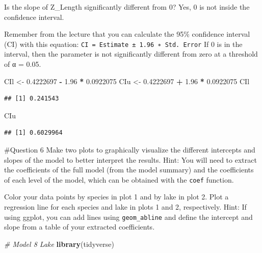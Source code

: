 \documentclass[
]{article}
\newenvironment{Shaded}{\begin{snugshade}}{\end{snugshade}}
\newcommand{\CommentTok}[1]{\textcolor[rgb]{0.56,0.35,0.01}{\textit{#1}}}
\newcommand{\FloatTok}[1]{\textcolor[rgb]{0.00,0.00,0.81}{#1}}
\newcommand{\FunctionTok}[1]{\textcolor[rgb]{0.13,0.29,0.53}{\textbf{#1}}}
\newcommand{\NormalTok}[1]{#1}
\newcommand{\OtherTok}[1]{\textcolor[rgb]{0.56,0.35,0.01}{#1}}
\newcommand{\SpecialCharTok}[1]{\textcolor[rgb]{0.81,0.36,0.00}{\textbf{#1}}}
\begin{document}
Is the slope of Z\_Length significantly different from 0? Yes, 0 is not
inside the confidence interval.

Remember from the lecture that you can calculate the 95\% confidence
interval (CI) with this equation:
\texttt{CI\ =\ Estimate\ ±\ 1.96\ ∗\ Std.\ Error} If 0 is in the
interval, then the parameter is not significantly different from zero at
a threshold of α = 0.05.

\begin{Shaded}
\begin{Highlighting}[]
\NormalTok{CIl }\OtherTok{\textless{}{-}} \FloatTok{0.4222697} \SpecialCharTok{{-}} \FloatTok{1.96} \SpecialCharTok{*} \FloatTok{0.0922075}
\NormalTok{CIu }\OtherTok{\textless{}{-}} \FloatTok{0.4222697} \SpecialCharTok{+} \FloatTok{1.96} \SpecialCharTok{*} \FloatTok{0.0922075}
\NormalTok{CIl}
\end{Highlighting}
\end{Shaded}

\begin{verbatim}
## [1] 0.241543
\end{verbatim}

\begin{Shaded}
\begin{Highlighting}[]
\NormalTok{CIu}
\end{Highlighting}
\end{Shaded}

\begin{verbatim}
## [1] 0.6029964
\end{verbatim}

\#Question 6 Make two plots to graphically visualize the different
intercepts and slopes of the model to better interpret the results.
Hint: You will need to extract the coefficients of the full model (from
the model summary) and the coefficients of each level of the model,
which can be obtained with the \texttt{coef} function.

Color your data points by species in plot 1 and by lake in plot 2. Plot
a regression line for each species and lake in plots 1 and 2,
respectively. Hint: If using ggplot, you can add lines using
\texttt{geom\_abline} and define the intercept and slope from a table of
your extracted coefficients.

\begin{Shaded}
\begin{Highlighting}[]
\CommentTok{\# Model 8 Lake}
\FunctionTok{library}\NormalTok{(tidyverse)}
\end{Highlighting}
\end{Shaded}
\end{document}
